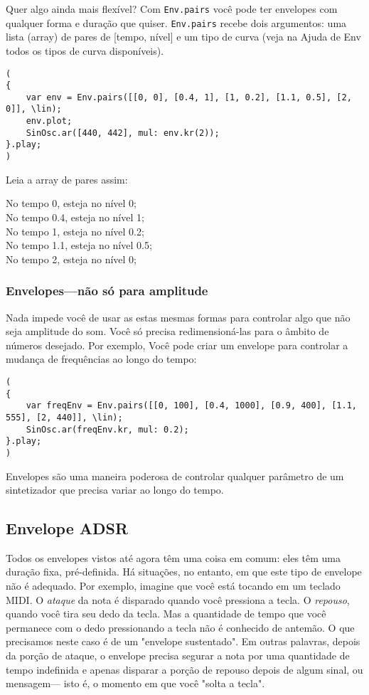 Quer algo ainda mais flexível? Com \texttt{Env.pairs} você pode ter envelopes com qualquer forma e duração que quiser. \texttt{Env.pairs} recebe dois argumentos: uma lista (array) de pares de [tempo, nível] e um tipo de curva (veja na Ajuda de Env todos os tipos de curva disponíveis).

 
\begin{lstlisting}[style=SuperCollider-IDE, basicstyle=\scttfamily\footnotesize]
(
{
	var env = Env.pairs([[0, 0], [0.4, 1], [1, 0.2], [1.1, 0.5], [2, 0]], \lin);
	env.plot;
	SinOsc.ar([440, 442], mul: env.kr(2));
}.play;
)
\end{lstlisting}
 
Leia a array de pares assim:
\begin{center}
No tempo 0, esteja no nível 0;\\
No tempo 0.4, esteja no nível 1;\\
No tempo 1, esteja no nível 0.2;\\
No tempo 1.1, esteja no nível 0.5;\\
No tempo 2, esteja no nível 0;
\end{center}

\subsubsection{Envelopes---não só para amplitude}

Nada impede você de usar as estas mesmas formas para controlar algo que não seja amplitude do som. Você só precisa redimensioná-las para o âmbito de números desejado. Por exemplo, Você pode criar um envelope para controlar a mudança de frequências ao longo do tempo:

\begin{lstlisting}[style=SuperCollider-IDE, basicstyle=\scttfamily\footnotesize]
(
{
	var freqEnv = Env.pairs([[0, 100], [0.4, 1000], [0.9, 400], [1.1, 555], [2, 440]], \lin);
	SinOsc.ar(freqEnv.kr, mul: 0.2);
}.play;
)
\end{lstlisting}

Envelopes são uma maneira poderosa de controlar qualquer parâmetro de um sintetizador que precisa variar ao longo do tempo.

\subsection{Envelope ADSR}

Todos os envelopes vistos até agora têm uma coisa em comum: eles têm uma duração fixa, pré-definida. Há situações, no entanto, em que este tipo de envelope não é adequado. Por exemplo, imagine que você está tocando em um teclado MIDI. O \textit{ataque} da nota é disparado quando você pressiona a tecla. O \textit{repouso}, quando você tira seu dedo da tecla. Mas a quantidade de tempo que você permanece com o dedo pressionando a tecla não é conhecido de antemão. O que precisamos neste caso é de um "envelope sustentado". Em outras palavras, depois da porção de ataque, o envelope precisa segurar a nota por uma quantidade de tempo indefinida e apenas disparar a porção de repouso depois de algum sinal, ou mensagem--- isto é, o momento em que você "solta a tecla".

